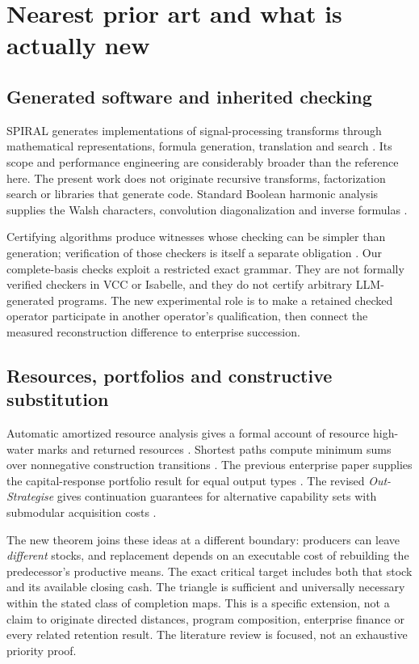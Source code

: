 \documentclass[11pt,letterpaper]{article}
\theoremstyle{definition}\newtheorem{definition}[theorem]{Definition}
\theoremstyle{remark}\newtheorem{remark}[theorem]{Remark}
\begin{document}
\section{Nearest prior art and what is actually new}
\subsection{Generated software and inherited checking}
SPIRAL generates implementations of signal-processing transforms through mathematical representations, formula generation, translation and search \cite{spiral}. Its scope and performance engineering are considerably broader than the reference here. The present work does not originate recursive transforms, factorization search or libraries that generate code. Standard Boolean harmonic analysis supplies the Walsh characters, convolution diagonalization and inverse formulas \cite{odonnell}.

Certifying algorithms produce witnesses whose checking can be simpler than generation; verification of those checkers is itself a separate obligation \cite{certifying}. Our complete-basis checks exploit a restricted exact grammar. They are not formally verified checkers in VCC or Isabelle, and they do not certify arbitrary LLM-generated programs. The new experimental role is to make a retained checked operator participate in another operator's qualification, then connect the measured reconstruction difference to enterprise succession.

\subsection{Resources, portfolios and constructive substitution}
Automatic amortized resource analysis gives a formal account of resource high-water marks and returned resources \cite{kahn}. Shortest paths compute minimum sums over nonnegative construction transitions \cite{dijkstra}. The previous enterprise paper supplies the capital-response portfolio result for equal output types \cite{previous}. The revised \emph{Out-Strategise} gives continuation guarantees for alternative capability sets with submodular acquisition costs \cite{strategise}.

The new theorem joins these ideas at a different boundary: producers can leave \emph{different} stocks, and replacement depends on an executable cost of rebuilding the predecessor's productive means. The exact critical target includes both that stock and its available closing cash. The triangle is sufficient and universally necessary within the stated class of completion maps. This is a specific extension, not a claim to originate directed distances, program composition, enterprise finance or every related retention result. The literature review is focused, not an exhaustive priority proof.
\end{document}
